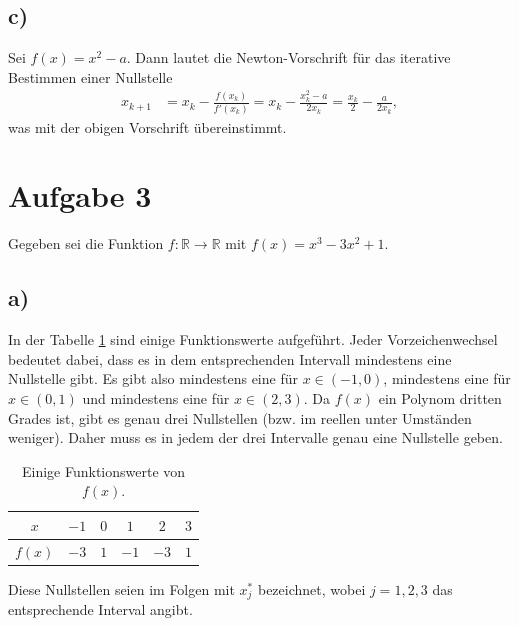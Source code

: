 \documentclass[english, parskip=full]{scrartcl}
\begin{document}
\subsection*{c)}
Sei $f(x) = x^2 - a$.
Dann lautet die Newton-Vorschrift für das iterative Bestimmen einer Nullstelle
\begin{align}
x_{k+1} &= x_k - \frac{f(x_k)}{f'(x_k)} = x_k - \frac{x_k^2 - a}{2x_k} = \frac{x_k}{2} - \frac{a}{2x_k},
\end{align}
was mit der obigen Vorschrift übereinstimmt.

\newpage
\section*{Aufgabe 3}
Gegeben sei die Funktion $f:\mathbb{R} \rightarrow\mathbb{R}$ mit $f(x) = x^3 - 3x^2 + 1$.

\subsection*{a)}
In der Tabelle \ref{table:f of x} sind einige Funktionswerte aufgeführt.
Jeder Vorzeichenwechsel bedeutet dabei, dass es in dem entsprechenden Intervall mindestens eine Nullstelle gibt.
Es gibt also mindestens eine für $x\in(-1,0)$, mindestens eine für $x\in(0,1)$ und mindestens eine für $x\in(2,3)$.
Da $f(x)$ ein Polynom dritten Grades ist, gibt es genau drei Nullstellen (bzw. im reellen unter Umständen weniger).
Daher muss es in jedem der drei Intervalle genau eine Nullstelle geben.
\begin{table}[!ht]
\centering
\begin{tabular}{c||c|c|c|c|c}
$x$ & $-1$ & $0$ & $1$ & $2$ & $3$ \\ \hline
$f(x)$ & $-3$ & $1$ & $-1$ & $-3$ & $1$\\
\end{tabular}
\caption{Einige Funktionswerte von $f(x)$.}
\label{table:f of x}
\end{table}
Diese Nullstellen seien im Folgen mit $x_j^\ast$ bezeichnet, wobei $j=1,2,3$ das entsprechende Interval angibt.
\end{document}
